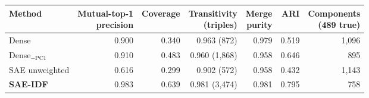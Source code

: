 \begin{tabular}{@{}lrrrrrr@{}}
\toprule
Method & \makecell{Mutual-top-1\\precision} & Coverage & \makecell{Transitivity\\(triples)} & \makecell{Merge\\purity} & ARI & \makecell{Components\\(489 true)} \\
\midrule
Dense & 0.900 & 0.340 & 0.963 (872) & 0.979 & 0.519 & 1,096 \\
Dense$_{-\mathrm{PC1}}$ & 0.910 & 0.483 & 0.960 (1,868) & 0.958 & 0.646 & 895 \\
SAE unweighted & 0.616 & 0.299 & 0.902 (572) & 0.958 & 0.432 & 1,143 \\
\textbf{SAE-IDF} & 0.983 & 0.639 & 0.981 (3,474) & 0.981 & 0.795 & 758 \\
\bottomrule
\end{tabular}
